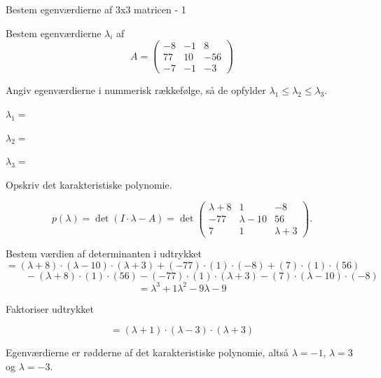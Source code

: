 \documentclass{article}
\begin{document}
\tableofcontents
\newpage

\begin{exercise}{Bestem egenværdierne af 3x3 matricen - 1}

Bestem egenværdierne $\lambda_i$ af
\[
A=\begin{pmatrix}
-8 & -1 & 8 \\
77 & 10 & -56 \\
-7 & -1 & -3
\end{pmatrix}
\]

Angiv egenværdierne i nummerisk rækkefølge, så de
opfylder $\lambda_1 \le \lambda_2 \le \lambda_3$.

$\lambda_1 = $ 

$\lambda_2 = $ 

$\lambda_3 = $ 

\hint
Opskriv det karakteristiske polynomie.

\hint
\[
p(\lambda)=\det\left(I \cdot \lambda - A \right)=\det\begin{pmatrix}
\lambda + 8 & 1 & -8 \\
-77 & \lambda - 10 & 56 \\
7 & 1 & \lambda + 3
\end{pmatrix}.
\]

\hint
Bestem værdien af determinanten i udtrykket
\[
=(\lambda + 8) \cdot (\lambda - 10) \cdot (\lambda + 3)+(-77) \cdot (1) \cdot (-8)+(7) \cdot (1) \cdot (56)
\]
\[
\qquad -(\lambda + 8) \cdot (1) \cdot (56)-(-77) \cdot (1) \cdot (\lambda + 3)-(7) \cdot (\lambda - 10) \cdot (-8)
\]
\[
=\lambda^3 + 1\lambda^2 - 9\lambda - 9
\]

\hint
Faktoriser udtrykket

\hint
\[
=(\lambda + 1) \cdot (\lambda - 3) \cdot (\lambda + 3)
\]

\hint
Egenværdierne er rødderne af det karakteristiske polynomie,
altså
$\lambda=-1$, $\lambda=3$ og $\lambda=-3$.

\end{exercise}
\end{document}
